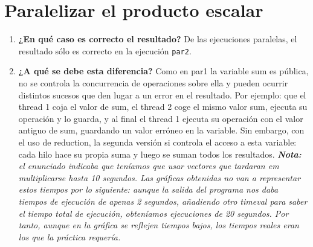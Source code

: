 \documentclass{report}
\newcommand\tab[1][0.6cm]{\hspace*{#1}}
\newcommand\nl{\newline\tab}
\begin{document}
	\newpage
	\section {Paralelizar el producto escalar}
	\begin{enumerate}
		\item{\textbf{\tab ¿En	qué	caso	es	correcto	el	resultado?	}\nl De las ejecuciones paralelas, el resultado sólo es correcto en la ejecución \texttt{par2}.
		}
		\item{\textbf{\tab ¿A	qué	se	debe	esta	diferencia?	}\nl
			Como en par1 la variable sum es pública, no se controla la concurrencia de operaciones sobre ella  y pueden ocurrir distintos sucesos que den lugar a un error en el resultado. Por ejemplo: que el thread 1 coja el valor de sum, el thread 2 coge el mismo valor sum, ejecuta su operación y lo guarda, y al final el thread 1 ejecuta su operación con el valor antiguo de sum, guardando un valor erróneo en la variable. Sin embargo, con el uso de reduction, la segunda versión si controla el acceso a esta variable: cada hilo hace su propia suma y luego se suman todos los resultados. 
		}
		\textit{\nl \newline \textbf{Nota:} el enunciado indicaba que teníamos que usar vectores que tardaran em multiplicarse hasta 10 segundos. Las gráficas obtenidas no van a representar estos tiempos por lo siguiente: aunque la salida del programa nos daba tiempos de ejecución de apenas 2 segundos, añadiendo otro timeval para saber el tiempo total de ejecución, obteníamos ejecuciones de 20 segundos. Por tanto, aunque en la gráfica se reflejen tiempos bajos, los tiempos reales eran los que la práctica requería.}
		

\end{enumerate}
\end{document}

